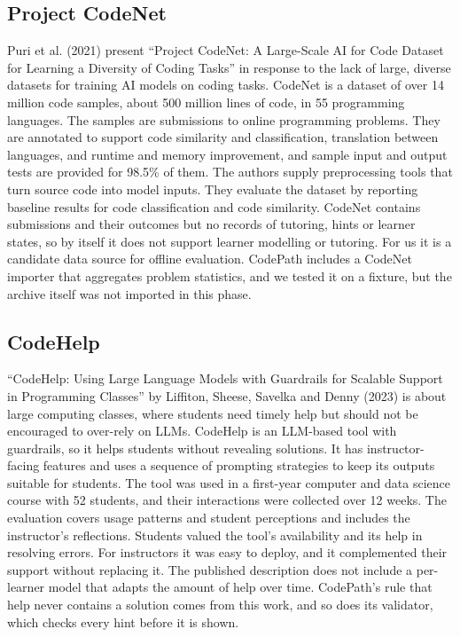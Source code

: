 \clearpage
\subsection{Project CodeNet}
Puri et al. (2021) present ``Project CodeNet: A Large-Scale AI for Code Dataset for Learning a Diversity of Coding Tasks'' \cite{puri2021} in response to the lack of large, diverse datasets for training AI models on coding tasks. CodeNet is a dataset of over 14 million code samples, about 500 million lines of code, in 55 programming languages. The samples are submissions to online programming problems. They are annotated to support code similarity and classification, translation between languages, and runtime and memory improvement, and sample input and output tests are provided for 98.5\% of them. The authors supply preprocessing tools that turn source code into model inputs. They evaluate the dataset by reporting baseline results for code classification and code similarity. CodeNet contains submissions and their outcomes but no records of tutoring, hints or learner states, so by itself it does not support learner modelling or tutoring. For us it is a candidate data source for offline evaluation. CodePath includes a CodeNet importer that aggregates problem statistics, and we tested it on a fixture, but the archive itself was not imported in this phase.

\subsection{CodeHelp}
``CodeHelp: Using Large Language Models with Guardrails for Scalable Support in Programming Classes'' by Liffiton, Sheese, Savelka and Denny (2023) \cite{liffiton2023} is about large computing classes, where students need timely help but should not be encouraged to over-rely on LLMs. CodeHelp is an LLM-based tool with guardrails, so it helps students without revealing solutions. It has instructor-facing features and uses a sequence of prompting strategies to keep its outputs suitable for students. The tool was used in a first-year computer and data science course with 52 students, and their interactions were collected over 12 weeks. The evaluation covers usage patterns and student perceptions and includes the instructor's reflections. Students valued the tool's availability and its help in resolving errors. For instructors it was easy to deploy, and it complemented their support without replacing it. The published description does not include a per-learner model that adapts the amount of help over time. CodePath's rule that help never contains a solution comes from this work, and so does its validator, which checks every hint before it is shown.

